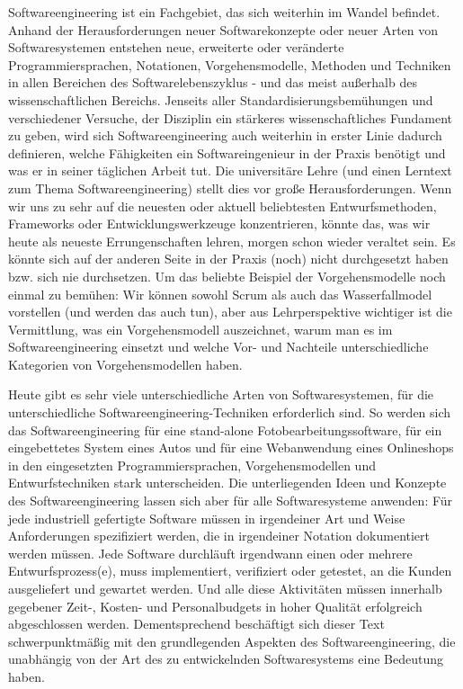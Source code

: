 Softwareengineering ist ein Fachgebiet, das sich weiterhin im Wandel befindet. Anhand der Herausforderungen neuer Softwarekonzepte oder neuer Arten von Soft\-ware\-syste\-men entstehen neue, erweiterte oder veränderte Programmiersprachen, Notationen, Vorgehensmodelle, Methoden und Techniken in allen Bereichen des Soft\-ware\-lebens\-zyklus - und das meist außerhalb des wissenschaftlichen Bereichs. Jenseits aller Standardisierungsbemühungen und verschiedener Versuche, der Disziplin ein stärkeres wissenschaftliches Fundament zu geben, wird sich Softwareengineering auch weiterhin in erster Linie dadurch definieren, welche Fähigkeiten ein Soft\-ware\-inge\-nieur in der Praxis benötigt und was er in seiner täglichen Arbeit tut. Die universitäre Lehre (und einen Lerntext zum Thema Softwareengineering) stellt dies vor große Herausforderungen. Wenn wir uns zu sehr auf die neuesten oder aktuell beliebtesten Entwurfsmethoden, Frameworks oder Entwicklungswerkzeuge konzentrieren, könnte das, was wir heute als neueste Errungenschaften lehren, morgen schon wieder veraltet sein. Es könnte sich auf der anderen Seite in der Praxis (noch) nicht durchgesetzt haben bzw. sich nie durchsetzen. Um das beliebte Beispiel der Vorgehensmodelle noch einmal zu bemühen: Wir können sowohl Scrum als auch das Wasserfallmodel vorstellen (und werden das auch tun), aber aus Lehrperspektive wichtiger ist die Vermittlung, was ein Vorgehensmodell auszeichnet, warum man es im Softwareengineering einsetzt und welche Vor- und Nachteile unterschiedliche Kategorien von Vorgehensmodellen haben.

Heute gibt es sehr viele unterschiedliche Arten von Softwaresystemen, für die unterschiedliche Softwareengineering-Techniken erforderlich sind. So werden sich das Softwareengineering für eine stand-alone Fotobearbeitungssoftware, für ein eingebettetes System eines Autos und für eine Webanwendung eines Onlineshops in den eingesetzten Programmiersprachen, Vorgehensmodellen und Entwurfstechniken stark unterscheiden.
Die unterliegenden Ideen und Konzepte des Softwareengineering lassen sich aber für alle Softwaresysteme anwenden: Für jede industriell gefertigte Software müssen in irgendeiner Art und Weise Anforderungen spezifiziert werden, die in irgendeiner Notation dokumentiert werden müssen. Jede Software durchläuft irgend\-wann einen oder mehrere Entwurfsprozess(e), muss implementiert, verifiziert oder getestet, an die Kunden ausgeliefert und gewartet werden. Und alle diese Aktivitäten müssen innerhalb gegebener Zeit-, Kosten- und Personalbudgets in hoher Qualität erfolgreich abgeschlossen werden. Dementsprechend beschäftigt sich dieser Text schwerpunktmäßig mit den grundlegenden Aspekten des Softwareengineering, die unabhängig von der Art des zu entwickelnden Softwaresystems eine Bedeutung haben.

\clearpage %